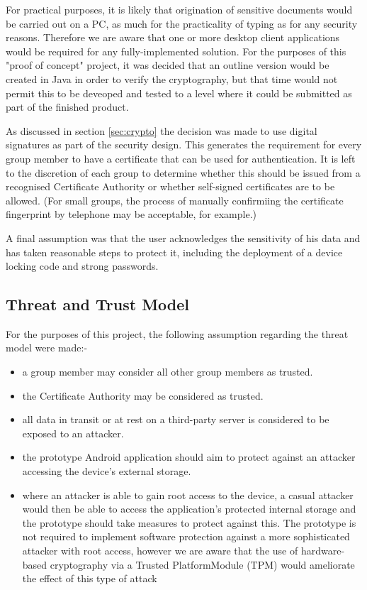 For practical purposes, it is likely that origination of sensitive documents would be carried out on a PC, as much for the practicality of typing as for any security reasons.  Therefore we are aware that one or more desktop client applications would be required for any fully-implemented solution.  For the purposes of this "proof of concept" project, it was decided that an outline version would be created in Java in order to verify the cryptography, but that time would not permit this to be deveoped and tested to a level where it could be submitted as part of the finished product.  

As discussed in section \ref{sec:crypto} the decision was made to use digital signatures as part of the security design. This generates the requirement for every group member to have a certificate that can be used for authentication. It is left to the discretion of each group to determine  whether this should be issued from a recognised Certificate Authority or whether self-signed certificates are to be allowed.  (For small groups, the process of manually confirmiing the certificate fingerprint by telephone may be acceptable, for example.) 

A final assumption was that the user acknowledges the sensitivity of his data and has taken reasonable steps to protect it, including the deployment of a device locking code and strong passwords.

\subsection{Threat and Trust Model}
For the purposes of this project, the following assumption regarding the threat model were made:-
\begin{itemize}
\item a group member may consider all other group members as trusted.
\item the Certificate Authority may be considered as trusted.  
\item all data in transit or at rest on a third-party server is considered to be exposed to an attacker.
\item the prototype Android application should aim to protect against an attacker accessing the device's external storage.  
\item  where an attacker is able to gain root access to the device, a casual attacker would then be able to access the application's protected internal storage and the prototype should take measures to protect against this.  The prototype is not required to implement software protection against a more sophisticated attacker with root access, however we are aware that the use of hardware-based cryptography via a Trusted PlatformModule (TPM) would ameliorate the effect of this type of attack
\end{itemize}


